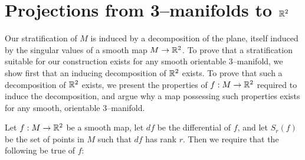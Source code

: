 \section{Projections from 3--manifolds to $\mathbb{R}^2$}
\label{section:smooth-projection}

Our stratification of $M$ is induced by a decomposition of the plane, itself induced by the singular values of a smooth map $M\to\mathbb{R}^2$.
To prove that a stratification suitable for our construction exists for any smooth orientable 3--manifold, we show first that an inducing decomposition of $\mathbb{R}^2$ exists.
To prove that such a decomposition of $\mathbb{R}^2$ exists, we present the properties of $f:M\to\mathbb{R}^2$ required to induce the decomposition, and argue why a map possessing such properties exists for any smooth, orientable 3--manifold.

Let $f:M\to\mathbb{R}^2$ be a smooth map, let $df$ be the differential of $f$, and let $S_r(f)$ be the set of points in $M$ such that $df$ has rank $r$.
Then we require that the following be true of $f$:
